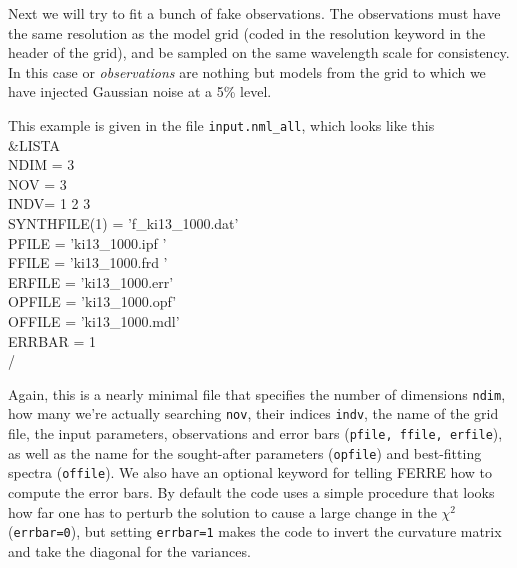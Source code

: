 \documentclass[12pt]{article}
\begin{document}
Next we will try to fit a bunch of fake observations. The observations
must have the same resolution as the model grid (coded in the {\sc resolution}
keyword in the header of the grid), and be sampled on the same wavelength scale
for consistency. In this case or {\it observations} are nothing but models from 
the grid to which we have injected Gaussian noise at a 5\% level. 

This example is given in the file {\tt input.nml\_all}, which looks like this \\
 \&LISTA \\ 
 NDIM = 3 \\
 NOV = 3 \\
 INDV= 1 2 3 \\
 SYNTHFILE(1) = 'f\_ki13\_1000.dat' \\
 PFILE = 'ki13\_1000.ipf ' \\
 FFILE = 'ki13\_1000.frd ' \\
 ERFILE = 'ki13\_1000.err' \\
 OPFILE = 'ki13\_1000.opf' \\
 OFFILE = 'ki13\_1000.mdl' \\
 ERRBAR = 1 \\
 \// 

Again, this is a nearly minimal file that specifies the number of dimensions {\tt ndim}, 
how many we're actually searching {\tt nov}, their indices {\tt indv}, the name of 
the grid file, the input parameters, observations and error bars ({\tt pfile, ffile, erfile}), 
as well as the name for the sought-after parameters ({\tt opfile})
and best-fitting spectra ({\tt offile}). We also have an optional keyword for telling 
FERRE how to compute the error bars. By default the code uses a simple procedure that 
looks how far one has to perturb the solution to cause a large change in 
the $\chi^2$ ({\tt errbar=0}), but setting {\tt errbar=1} makes the code to 
invert the curvature matrix and take the diagonal for the variances.
\end{document}
